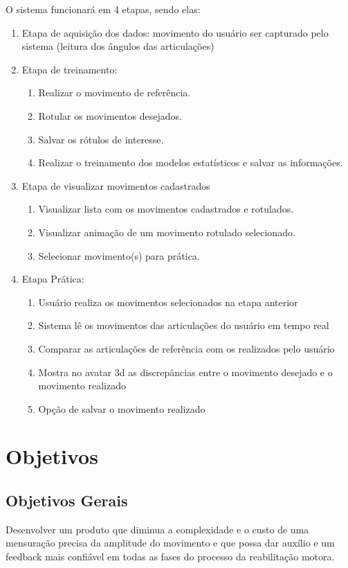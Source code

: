   O sistema funcionará em 4 etapas, sendo elas:
  \begin{enumerate}
  \item Etapa de aquisição dos dados: movimento do usuário ser capturado pelo sistema (leitura dos ângulos das articulações)
  \item Etapa de treinamento: 
    \begin{enumerate}
    \item Realizar o movimento de referência.
    \item Rotular os movimentos desejados.
    \item Salvar os rótulos de interesse.
    \item Realizar o treinamento dos modelos estatísticos e salvar as informações.
    \end{enumerate}
  \item Etapa de visualizar movimentos cadastrados
    \begin{enumerate}
    \item Visualizar lista com os movimentos cadastrados e rotulados.
    \item Visualizar animação de um movimento rotulado selecionado.
    \item Selecionar movimento(s) para prática.
  \end{enumerate}  
  \item Etapa Prática:
    \begin{enumerate}
    \item Usuário realiza os movimentos selecionados na etapa anterior
    \item Sistema lê os movimentos das articulações do usuário em tempo real
    \item Comparar as articulações de referência com os realizados pelo usuário
    \item Mostra no avatar 3d as discrepâncias entre o movimento desejado e o movimento realizado
    \item Opção de salvar o movimento realizado
    \end{enumerate}
  \end{enumerate}                   
\section{Objetivos}                                                             
\label{Sec:Objetivos}
\subsection{Objetivos Gerais}                           
\label{Sub:ObjetivosGerais}
  Desenvolver um produto que diminua a complexidade e o custo de uma mensuração 
precisa da amplitude do movimento e que possa dar auxílio e um feedback mais 
confiável em todas as fases do processo da reabilitação motora.

